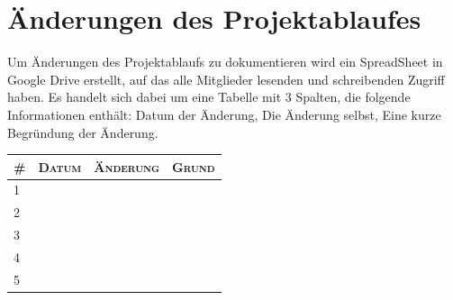 \documentclass[lang=ngerman,inputenc=utf8,fontsize=10pt]{ldvarticle}
\begin{document}
\section{Änderungen des Projektablaufes}
Um Änderungen des Projektablaufs zu dokumentieren wird ein SpreadSheet in Google Drive erstellt, auf das alle Mitglieder lesenden und schreibenden Zugriff haben. Es handelt sich dabei um eine Tabelle mit 3 Spalten, die folgende Informationen enthält: Datum der Änderung, Die Änderung selbst, Eine kurze Begründung der Änderung.



\begin{tabular}[htbp]{|p{}||p{}|p{}|p{}|}
\hline
\textsc{\#} & \textsc{Datum} & \textsc{Änderung} & \textsc{Grund} \\
\hline
\hline
1 & & & \\[1em]
\hline
2 & & & \\[1em]
\hline
3 & & & \\[1em]
\hline
4 & & & \\[1em]
\hline
5 & & & \\[1em]
\hline
\end{tabular}
\end{document}

